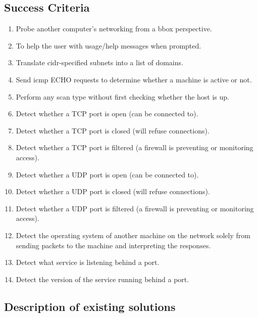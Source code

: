 \documentclass[titlepage]{article}
\let\Oldsubsection\subsection{}
\renewcommand{\subsection}{\FloatBarrier\Oldsubsection}
\begin{document}
\subsection{Success Criteria}

\begin{enumerate}

  \item{%
    Probe another computer's networking from a \gls{bbox} perspective.
  }\label{blackbox}
  \item{%
    To help the user with usage/help messages when prompted.  
  }\label{usage}
  \item{%
    Translate \gls{cidr}-specified subnets into a list of domains.
  }\label{cidr}
  \item{%
    Send \gls{icmp} ECHO requests to determine whether a machine is active
    or not.
  }\label{ping}
  \item{%
    Perform any scan type without first checking whether the host is up.
  }\label{nocheck}
  \item{%
    Detect whether a TCP port is open (can be connected to).
  }\label{tcpopen}
  \item{%
    Detect whether a TCP port is closed (will refuse connections).
  }\label{tcpclosed}
  \item{%
    Detect whether a TCP port is filtered (a firewall is
    preventing or monitoring access).
  }\label{tcpfiltered}
  \item{%
    Detect whether a UDP port is open (can be connected to).
  }\label{udpopen}
  \item{%
    Detect whether a UDP port is closed (will refuse connections).
  }\label{udpclosed}
  \item{%
    Detect whether a UDP port is filtered (a firewall is
    preventing or monitoring access).
  }\label{udpfiltered}
  \item{%
    Detect the operating system of another machine on the network
    solely from sending packets to the machine and interpreting the responses.
  }\label{osdetect}
  \item{%
    Detect what service is listening behind a port.
  }\label{servicedetect}
  \item{%
    Detect the version of the service running behind a port.
  }\label{versiondetect}

\end{enumerate}

\subsection{Description of existing solutions}
\end{document}
